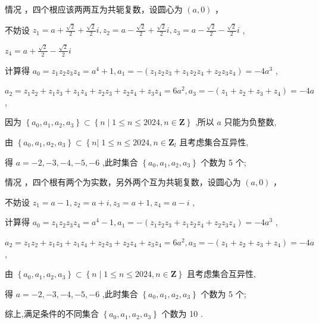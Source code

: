 \documentclass[10pt]{article}
\newcommand*\circled[1]{\tikz[baseline=(char.base)]{\node[shape=circle,draw,inner sep=1.5pt] (char) {\small #1};}}
\begin{document}
情况 \circled{1} ，四个根应该两两互为共轭复数，设圆心为 \(\left( {a,0}\right)\) ，

不妨设 \({z}_{1} = a + \frac{\sqrt{2}}{2} + \frac{\sqrt{2}}{2}i,{z}_{2} = a - \frac{\sqrt{2}}{2} + \frac{\sqrt{2}}{2}i,{z}_{3} = a - \frac{\sqrt{2}}{2} - \frac{\sqrt{2}}{2}i\) ,

\({z}_{4} = a + \frac{\sqrt{2}}{2} - \frac{\sqrt{2}}{2}i\)

计算得 \({a}_{0} = {z}_{1}{z}_{2}{z}_{3}{z}_{4} = {a}^{4} + 1,{a}_{1} =  - \left( {{z}_{1}{z}_{2}{z}_{3} + {z}_{1}{z}_{2}{z}_{4} + {z}_{2}{z}_{3}{z}_{4}}\right)  =  - 4{a}^{3}\) ,

\({a}_{2} = {z}_{1}{z}_{2} + {z}_{1}{z}_{3} + {z}_{1}{z}_{4} + {z}_{2}{z}_{3} + {z}_{2}{z}_{4} + {z}_{3}{z}_{4} = 6{a}^{2},{a}_{3} =  - \left( {{z}_{1} + {z}_{2} + {z}_{3} + {z}_{4}}\right)  =  - {4a}\) ,

因为 \(\left\{  {{a}_{0},{a}_{1},{a}_{2},{a}_{3}}\right\}   \subset  \left\{  {n \mid  1 \leq  n \leq  {2024},n \in  \mathbf{Z}}\right\}\) ,所以 \(a\) 只能为负整数,

由 \(\left\{  {{a}_{0},{a}_{1},{a}_{2},{a}_{3}}\right\}   \subset  \left\{  {n\left| {\;1 \leq  n \leq  {2024},n \in  {\mathbf{Z}}_{l}}\right. }\right.\) 且考虑集合互异性,

得 \(a =  - 2, - 3, - 4, - 5, - 6\) ,此时集合 \(\left\{  {{a}_{0},{a}_{1},{a}_{2},{a}_{3}}\right\}\) 个数为 5 个;

情况 \circled{2} ，四个根有两个为实数，另外两个互为共轭复数，设圆心为 \(\left( {a,0}\right)\) ，

不妨设 \({z}_{1} = a - 1,{z}_{2} = a + i,{z}_{3} = a + 1,{z}_{4} = a - i\) ,

计算得 \({a}_{0} = {z}_{1}{z}_{2}{z}_{3}{z}_{4} = {a}^{4} - 1,{a}_{1} =  - \left( {{z}_{1}{z}_{2}{z}_{3} + {z}_{1}{z}_{2}{z}_{4} + {z}_{2}{z}_{3}{z}_{4}}\right)  =  - 4{a}^{3}\) ,

\({a}_{2} = {z}_{1}{z}_{2} + {z}_{1}{z}_{3} + {z}_{1}{z}_{4} + {z}_{2}{z}_{3} + {z}_{2}{z}_{4} + {z}_{3}{z}_{4} = 6{a}^{2},{a}_{3} =  - \left( {{z}_{1} + {z}_{2} + {z}_{3} + {z}_{4}}\right)  =  - {4a}\) ,

由 \(\left\{  {{a}_{0},{a}_{1},{a}_{2},{a}_{3}}\right\}   \subset  \left\{  {n \mid  1 \leq  n \leq  {2024},n \in  \mathbf{Z}}\right\}\) 且考虑集合互异性,

得 \(a =  - 2, - 3, - 4, - 5, - 6\) ,此时集合 \(\left\{  {{a}_{0},{a}_{1},{a}_{2},{a}_{3}}\right\}\) 个数为 5 个;

综上,满足条件的不同集合 \(\left\{  {{a}_{0},{a}_{1},{a}_{2},{a}_{3}}\right\}\) 个数为 10 .
\end{document}
